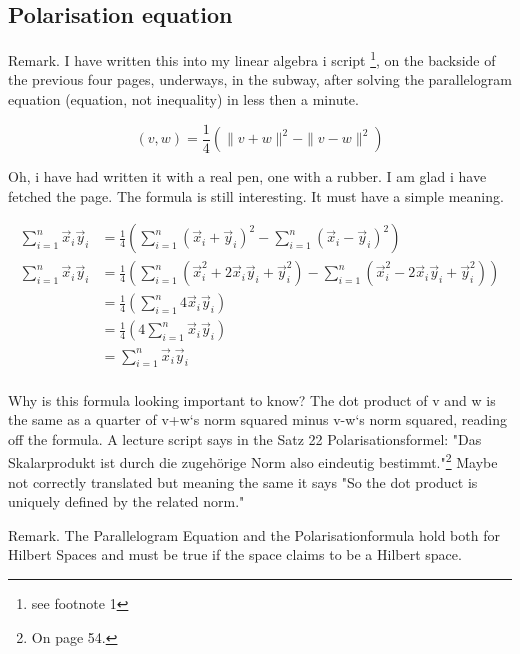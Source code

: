 \documentclass[a4paper]{article}
\begin{document}
\subsection{Polarisation equation}

Remark. I have written this into my linear algebra i script \cite{FerusLA}\footnote{see footnote 1}, on the backside of the previous four pages, underways, 
in the subway, after solving the parallelogram equation (equation, not inequality) in less then a minute. 

\begin{displaymath}
(v,w) = \frac{1}{4}(\|v+w\|^{2}-\|v-w\|^{2})
\end{displaymath}

Oh, i have had written it with a real pen, one with a rubber. I am glad i have fetched the page. The formula is still interesting.
It must have a simple meaning.

\begin{displaymath}
\begin{align}
\sum_{i=1}^{n}\vec{x}_{i}\vec{y}_{i} &= \frac{1}{4}(\sum_{i=1}^{n}(\vec{x}_{i}+\vec{y}_{i})^{2} - \sum_{i=1}^{n}(\vec{x}_{i}-\vec{y}_{i})^{2}) \\
\sum_{i=1}^{n}\vec{x}_{i}\vec{y}_{i} &= \frac{1}{4}(\sum_{i=1}^{n}(\vec{x}_{i}^{2}+2\vec{x}_{i}\vec{y}_{i}+\vec{y}_{i}^{2})-\sum_{i=1}^{n}(\vec{x}_{i}^{2}-2\vec{x}_{i}\vec{y}_{i}+\vec{y}_{i}^{2}))\\
&= \frac{1}{4}(\sum_{i=1}^{n}4\vec{x}_{i}\vec{y}_{i})\\
&= \frac{1}{4}(4\sum_{i=1}^{n}\vec{x}_{i}\vec{y}_{i})\\
&= \sum_{i=1}^{n}\vec{x}_{i}\vec{y}_{i}\\
\end{align}
\end{displaymath}

Why is this formula looking important to know? The dot product of v and w is the same as a quarter of v+w`s norm squared minus v-w`s norm squared, reading off the formula. A lecture script \cite{FerusLA} says in the Satz 22 Polarisationsformel: "Das Skalarprodukt ist durch die zugeh\"orige Norm also eindeutig bestimmt."\footnote{On page 54.} Maybe not correctly translated but meaning the same it says "So the dot product is uniquely defined by the related norm."

Remark. The Parallelogram Equation and the Polarisationformula hold both for Hilbert Spaces and must be true if the space claims to be a Hilbert space.
\end{document}
